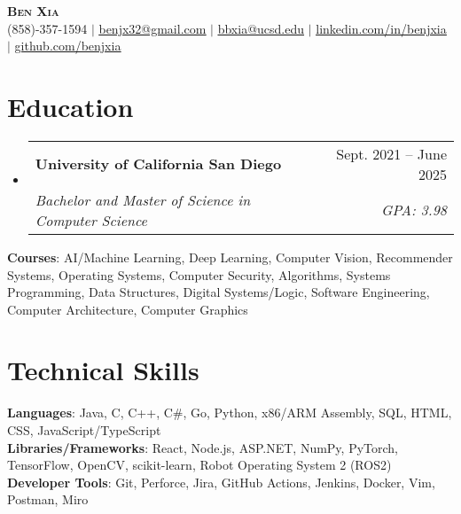 \documentclass[letterpaper, 10pt]{article}
\makeatletter
\newcommand{\resumeSubheading}[4]{
  \vspace{4pt}\item
    \begin{tabular*}{0.97\textwidth}[t]{l@{\extracolsep{\fill}}r}
      \textbf{#1} & #2 \\
      \textit{#3} & \textit{\small #4} \\
    \end{tabular*}\vspace{-7pt}
}
\newcommand{\resumeSubHeadingListStart}{\begin{itemize}[leftmargin=0.15in, label={}]}
\newcommand{\resumeSubHeadingListEnd}{\end{itemize}}
\makeatother
\begin{document}

\begin{center}
  \textbf{\Huge \scshape Ben Xia} \uline{} \\ \vspace{1pt}
  \small (858)-357-1594 $|$
  \href{mailto:benjx32@gmail.com}{\uline{benjx32@gmail.com}} $|$
  \href{mailto:bbxia@ucsd.edu}{\uline{bbxia@ucsd.edu}} $|$
  \href{https://linkedin.com/in/benjxia}{\uline{linkedin.com/in/benjxia}} $|$
  \href{https://github.com/benjxia}{\uline{github.com/benjxia}}
\end{center}



\section{Education}
  \resumeSubHeadingListStart
  \resumeSubheading
      {University of California San Diego}{Sept. 2021 -- June 2025}
      {Bachelor and Master of Science in Computer Science}{GPA: 3.98}
  \resumeSubHeadingListEnd
  \begin{itemize}[leftmargin=0.15in, label={}]
    \small{\item{
     \textbf{Courses}{: AI/Machine Learning, Deep Learning, Computer Vision, Recommender Systems, Operating Systems, Computer Security, Algorithms, Systems Programming, Data Structures, Digital Systems/Logic, Software Engineering, Computer Architecture, Computer Graphics } \\
    }}
 \end{itemize}

%
\section{Technical Skills}
 \begin{itemize}[leftmargin=0.15in, label={}]
    \small{\item{
     \textbf{Languages}{: Java, C, C++, C\#, Go, Python, x86/ARM Assembly, SQL, HTML, CSS, JavaScript/TypeScript} \\
     \textbf{Libraries/Frameworks}{: React, Node.js, ASP.NET, NumPy, PyTorch, TensorFlow, OpenCV, scikit-learn, Robot Operating System 2 (ROS2)} \\
     \textbf{Developer Tools}{: Git, Perforce, Jira, GitHub Actions, Jenkins, Docker, Vim, Postman, Miro} \\
    }}
 \end{itemize}
\end{document}
